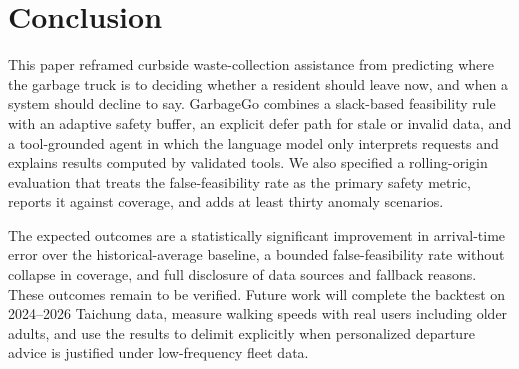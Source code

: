 \section{Conclusion}\label{sec:conclusion}
This paper reframed curbside waste-collection assistance from predicting where the garbage truck is to deciding whether a resident should leave now, and when a system should decline to say. GarbageGo combines a slack-based feasibility rule with an adaptive safety buffer, an explicit defer path for stale or invalid data, and a tool-grounded agent in which the language model only interprets requests and explains results computed by validated tools. We also specified a rolling-origin evaluation that treats the false-feasibility rate as the primary safety metric, reports it against coverage, and adds at least thirty anomaly scenarios.

The expected outcomes are a statistically significant improvement in arrival-time error over the historical-average baseline, a bounded false-feasibility rate without collapse in coverage, and full disclosure of data sources and fallback reasons. These outcomes remain to be verified. Future work will complete the backtest on 2024--2026 Taichung data, measure walking speeds with real users including older adults, and use the results to delimit explicitly when personalized departure advice is justified under low-frequency fleet data.
